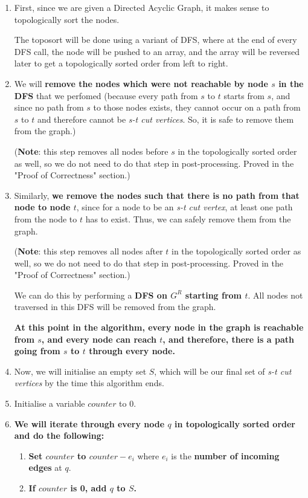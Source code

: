 \documentclass{article}
\begin{document}
\begin{enumerate}
    \item First, since we are given a Directed Acyclic Graph, it makes sense to topologically sort the nodes. 

    The toposort will be done using a variant of DFS, where at the end of every DFS call, the node will be pushed to an array, and the array will be reversed later to get a topologically sorted order from left to right. 

\item We will \textbf{remove the nodes which were not reachable by node $s$ in the DFS} that we perfomed (because every path from $s$ to $t$ starts from $s$, and since no path from $s$ to those nodes exists, they cannot occur on a path from $s$ to $t$ and therefore cannot be \emph{s-t cut vertices}. So, it is safe to remove them from the graph.) 

    (\textbf{Note}: this step removes all nodes before $s$ in the topologically sorted order as well, so we do not need to do that step in post-processing. Proved in the "Proof of Correctness" section.)

\item Similarly, \textbf{we remove the nodes such that there is no path from that node to node $t$}, since for a node to be an \emph{s-t cut vertex}, at least one path from the node to $t$ has to exist. Thus, we can safely remove them from the graph. 

    (\textbf{Note}: this step removes all nodes after $t$ in the topologically sorted order as well, so we do not need to do that step in post-processing. Proved in the "Proof of Correctness" section.)

        We can do this by performing a \textbf{DFS on $G^R$ starting from $t$}. All nodes not traversed in this DFS will be removed from the graph.

    \textbf{At this point in the algorithm, every node in the graph is reachable from $s$, and every node can reach $t$, and therefore, there is a path going from $s$ to $t$ through every node.}

    \item Now, we will initialise an empty set $S$, which will be our final set of \emph{s-t cut vertices} by the time this algorithm ends. 

    \item Initialise a variable $counter$ to 0. 

    \newpage

\item \textbf{We will iterate through every node $q$ in topologically sorted order and do the following:}
        \begin{enumerate}
            \item \textbf{Set $counter$ to $counter - e_i$} where $e_i$ is the \textbf{number of incoming edges} at $q$. 
            \item \textbf{If $counter$ is 0, add $q$ to $S$.}


\end{enumerate}
\end{enumerate}
\end{document}
